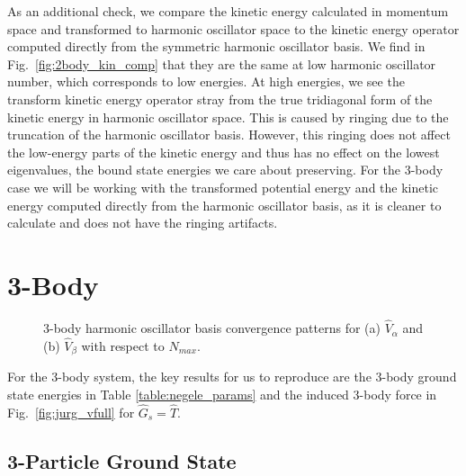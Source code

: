 As an additional check, we compare the kinetic energy calculated in momentum space and transformed to harmonic oscillator space to the kinetic energy operator computed directly from the symmetric harmonic oscillator basis. We find in Fig.~\ref{fig:2body_kin_comp} that they are the same at low harmonic oscillator number, which corresponds to low energies. At high energies, we see the transform kinetic energy operator stray from the true tridiagonal form of the kinetic energy in harmonic oscillator space. This is caused by ringing due to the truncation of the harmonic oscillator basis. However, this ringing does not affect the low-energy parts of the kinetic energy and thus has no effect on the lowest eigenvalues, the bound state energies we care about preserving. For the 3-body case we will be working with the transformed potential energy and the kinetic energy computed directly from the harmonic oscillator basis, as it is cleaner to calculate and does not have the ringing artifacts.%

\section{3-Body}

\begin{figure}[t]
\begin{center}
\end{center}
\caption{3-body harmonic oscillator basis convergence patterns for (a) $\hat{V}_\alpha$ and (b) $\hat{V}_\beta$ with respect to $N_{max}$.}
\label{fig:3body_nmax}
\end{figure}

For the 3-body system, the key results for us to reproduce are the 3-body ground state energies in Table \ref{table:negele_params} and the induced 3-body force in Fig.~\ref{fig:jurg_vfull} for $\hat{G}_s=\hat{T}$.

\subsection{3-Particle Ground State}

